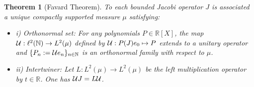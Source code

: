 \documentclass[a4paper,11pt,twoside]{article}
\numberwithin{equation}{section}
\newtheorem{theorem}[Theorem]{Theorem}
\theoremstyle{nonumberplain}
\begin{document}
\begin{theorem} [Favard Theorem]\label{Favard}
To each bounded Jacobi operator $J$ is associated a unique compactly supported measure $\mu$ satisfying:
\begin{itemize}
\vspace*{-4pt}
\setlength{\itemsep}{-1pt}
\item i) Orthonormal set:  For any polynomials $P\in\mathbb{R}[X]$, the map ${\cal{U}}:\ell^2(\mathbb{N})\to L^2(\mu)$ defined by ${\cal{U}}:P(J)e_0\mapsto P$ extends to a unitary operator and $\{P_n:={\cal{U}}e_n\}_{n\in\mathbb{N}}$ is an orthonormal family with respect to $\mu$.
\item ii) Intertwiner: Let $L:L^2(\mu)\to L^2(\mu)$ be the left multiplication operator by $t\in\mathbb{R}$. One has ${\cal{U}}J=L\cal{U}$.
\end{itemize}
\end{theorem}
\end{document}
